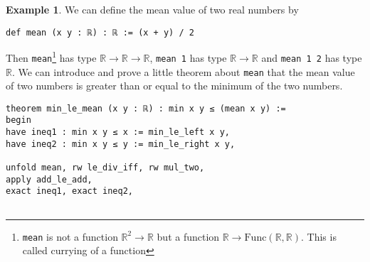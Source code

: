\documentclass{report}
\theoremstyle{definition}
\newtheorem{example}{Example}
\theoremstyle{plain}
\begin{document}
\begin{example}
We can define the mean value of two real numbers by
\begin{verbatim}
def mean (x y : ℝ) : ℝ := (x + y) / 2
\end{verbatim}
Then \texttt{mean}\footnote{\texttt{mean} is not a function $\mathbb R^2\to\mathbb R$ but a function $\mathbb R\to\mathrm{Func}(\mathbb R,\mathbb R)$. This is called currying of a function} has type $\mathbb R\to \mathbb R\to \mathbb R$, \texttt{mean 1} has type $\mathbb R\to \mathbb R$ and \texttt{mean 1 2} has type $\mathbb R$. We can introduce and prove a little theorem about \texttt{mean} that the mean value of two numbers is greater than or equal to the minimum of the two numbers.
\begin{verbatim}
theorem min_le_mean (x y : ℝ) : min x y ≤ (mean x y) :=
begin
have ineq1 : min x y ≤ x := min_le_left x y,
have ineq2 : min x y ≤ y := min_le_right x y,
  
unfold mean, rw le_div_iff, rw mul_two, 
apply add_le_add, 
exact ineq1, exact ineq2, 


\end{verbatim}
\end{example}
\end{document}
